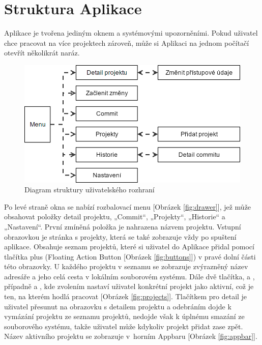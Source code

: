 \section{Struktura Aplikace}

Aplikace je tvořena jediným oknem a systémovými upozorněními. Pokud uživatel chce pracovat na více projektech zároveň, může si Aplikaci na jednom počítačí otevřít několikrát naráz.

\FloatBarrier
\begin{figure}[ht]
	\centering
	\includegraphics[width=\textwidth]{sections/ui/images/flow.png}
	\caption{Diagram struktury uživatelského rozhraní}
\end{figure}
\FloatBarrier

Po levé straně okna se nabízí rozbalovací menu [Obrázek \ref{fig:drawer}], jež může obsahovat položky detail projektu, „Commit“, „Projekty“, „Historie“ a „Nastavení“. První zmíněná položka je nahrazena názvem projektu. Vstupní obrazovkou je stránka s projekty, která se také zobrazuje vždy po spuštení aplikace. Obsahuje seznam projektů, které si uživatel do Aplikace přidal pomocí tlačítka plus (Floating Action Button [Obrázek \ref{fig:buttons}]) v pravé dolní části této obrazovky. U každého projektu v seznamu se zobrazuje zvýrazněný název adresáře a jeho celá cesta v lokálním souborovém systému. Dále dvě tlačítka,  a , případně  a , kde zvolením nastaví uživatel konkrétní projekt jako aktivní, což je ten, na kterém hodlá pracovat [Obrázek \ref{fig:projects}]. Tlačítkem pro detail je uživatel přesunut na obrazovku s detailem projektu a odebráním dojde k vymázání projektu ze seznamu projektů, nedojde však k úplnému smazání ze souborového systému, takže uživatel může kdykoliv projekt přidat zase zpět. Název aktivního projektu se zobrazuje v~horním Appbaru [Obrázek \ref{fig:appbar}].

